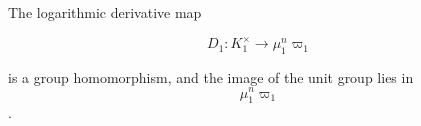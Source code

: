 The logarithmic derivative map

$$D_1 : K_1^{\times} \to \mu_1^n \varpi_1$$

is a group homomorphism, and the image of the unit group lies in $$\mu_1^n \varpi_1$$.
